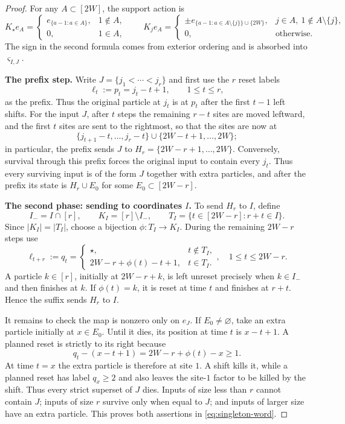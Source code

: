 \documentclass[11pt,reqno]{amsart}
\numberwithin{equation}{section}
\theoremstyle{definition}
\theoremstyle{remark}
\newcommand{\1}{\mathbf 1}
\begin{document}
\begin{proof}
For any $A\subset[2W]$, the support action is
\[
 K_\star e_A=
 \begin{cases}
  e_{\{a-1:a\in A\}},&1\notin A,\\
  0,&1\in A,
 \end{cases}
 \qquad
 K_je_A=
 \begin{cases}
  \pm e_{\{a-1:a\in A\setminus\{j\}\}\cup\{2W\}},
       &j\in A,\ 1\notin A\setminus\{j\},\\
  0,&\text{otherwise}.
 \end{cases}
\]
The sign in the second formula comes from exterior ordering and is absorbed
into $\varsigma_{I,J}$.


\textbf{The prefix step.} Write $J=\{j_1<\cdots<j_r\}$ and first use the $r$ reset labels
\[
 \ell_t:=p_t=j_t-t+1,\qquad 1\le t\le r,
\]
as the prefix.  Thus the original particle at $j_t$ is at $p_t$ after the
first $t-1$ left shifts.
For the input $J$, after $t$ steps the remaining $r-t$ sites are moved leftward, and the first $t$ sites are sent to the rightmost, so that the sites are now at
\[
 \{j_{t+1}-t,\ldots,j_r-t\}
 \cup\{2W-t+1,\ldots,2W\};
\]
in particular, the prefix sends $J$ to
$H_r=\{2W-r+1,\ldots,2W\}$.  Conversely, survival through this prefix
forces the original input to contain every $j_t$.  Thus every surviving
input is of the form $J$ together with extra particles, and after the
prefix its state is $H_r\cup E_0$ for some $E_0\subset[2W-r]$.

\textbf{The second phase: sending to coordinates $I$.} To send $H_r$ to $I$, define
\[
 I_-=I\cap[r],\qquad K_I=[r]\setminus I_-,\qquad
 T_I=\{t\in[2W-r]:r+t\in I\}.
\]
Since $|K_I|=|T_I|$, choose a bijection $\phi:T_I\to K_I$.  During the
remaining $2W-r$ steps use
\[
 \ell_{t+r}:=q_t=\begin{cases}
 \star,&t\notin T_I,\\
 2W-r+\phi(t)-t+1,&t\in T_I.
 \end{cases},\quad 1\le t\le 2W-r.
\]
A particle $k\in[r]$, initially at $2W-r+k$, is left unreset precisely when
$k\in I_-$ and then finishes at $k$.  If $\phi(t)=k$, it is reset at time
$t$ and finishes at $r+t$.  Hence the suffix sends $H_r$ to $I$.

It remains to check the map is nonzero only on $e_J$.  If $E_0\ne\varnothing$, take an
extra particle initially at $x\in E_0$.  Until it dies, its position at time
$t$ is $x-t+1$.  A planned reset is strictly to its right because
\[
 q_t-(x-t+1)=2W-r+\phi(t)-x\ge1.
\]
At time $t=x$ the extra particle is therefore at site $1$.  A shift kills
it, while a planned reset has label $q_x\ge2$ and also leaves the site-$1$
factor to be killed by the shift.  Thus every strict superset of $J$ dies.
Inputs of size less than $r$ cannot contain $J$; inputs of size $r$ survive
only when equal to $J$; and inputs of larger size have an extra particle.
This proves both assertions in \eqref{eq:singleton-word}.
\end{proof}
\end{document}
